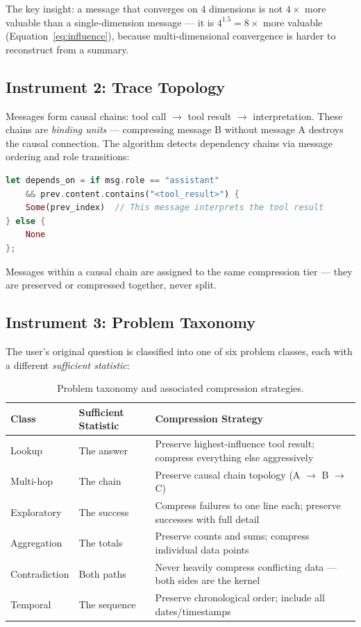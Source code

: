 \documentclass[11pt,a4paper]{article}
\begin{document}
The key insight: a message that converges on 4 dimensions is not $4\times$ more valuable than a single-dimension message --- it is $4^{1.5} = 8\times$ more valuable (Equation~\ref{eq:influence}), because multi-dimensional convergence is harder to reconstruct from a summary.

\subsection{Instrument 2: Trace Topology}

Messages form causal chains: tool call $\to$ tool result $\to$ interpretation. These chains are \emph{binding units} --- compressing message B without message A destroys the causal connection. The algorithm detects dependency chains via message ordering and role transitions:

\begin{lstlisting}[language=Rust, caption={Causal chain detection}]
let depends_on = if msg.role == "assistant"
    && prev.content.contains("<tool_result>") {
    Some(prev_index)  // This message interprets the tool result
} else {
    None
};
\end{lstlisting}

\noindent Messages within a causal chain are assigned to the same compression tier --- they are preserved or compressed together, never split.

\subsection{Instrument 3: Problem Taxonomy}

The user's original question is classified into one of six problem classes, each with a different \emph{sufficient statistic}:

\begin{table}[H]
\centering
\begin{tabular}{@{}llp{6.5cm}@{}}
\toprule
\textbf{Class} & \textbf{Sufficient Statistic} & \textbf{Compression Strategy} \\
\midrule
Lookup & The answer & Preserve highest-influence tool result; compress everything else aggressively \\
Multi-hop & The chain & Preserve causal chain topology (A $\to$ B $\to$ C) \\
Exploratory & The success & Compress failures to one line each; preserve successes with full detail \\
Aggregation & The totals & Preserve counts and sums; compress individual data points \\
Contradiction & Both paths & Never heavily compress conflicting data --- both sides are the kernel \\
Temporal & The sequence & Preserve chronological order; include all dates/timestamps \\
\bottomrule
\end{tabular}
\caption{Problem taxonomy and associated compression strategies.}
\label{tab:taxonomy}
\end{table}
\end{document}
